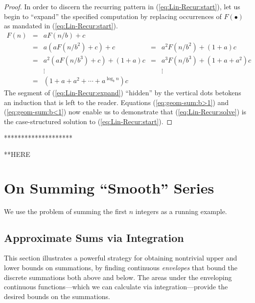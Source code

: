 {\begin{proof}
In order to discern the recurring pattern in
(\ref{eq:Lin-Recur:start}), let us begin to ``expand'' the specified
computation by replacing occurrences of $F(\bullet)$ as mandated in
(\ref{eq:Lin-Recur:start}).
\begin{equation}
\label{eq:Lin-Recur:expand}
\begin{array}{lcccc}
F(n) & = & a F(n/b) + c & & \\
     & = & a \left( a F(n/b^2) + c \right) + c
             & = & a^2 F(n/b^2) + (1 + a)c \\
     & = & a^2 \left( a F(n/b^3) + c \right) + (1+a)c
             & = & a^3 F(n/b^3) + (1 + a + a^2)c \\
     &   & \vdots & & \vdots \\
     & = & 
{\displaystyle
\left( 1 + a + a^2 + \cdots + a^{\log_b n} \right) c
} & &
\end{array}
\end{equation}
The segment of (\ref{eq:Lin-Recur:expand}) ``hidden'' by the vertical
dots betokens an induction that is left to the reader.  Equations
(\ref{eq:geom-sum:b>1}) and (\ref{eq:geom-sum:b<1}) now enable us to
demonstrate that (\ref{eq:Lin-Recur:solve}) is the case-structured
solution to (\ref{eq:Lin-Recur:start}).
\end{proof}
********************}


**HERE

\section{On Summing ``Smooth'' Series}
\label{sec:smooth-series}

We use the problem of summing the first $n$ integers as a running
example.

\subsection{Approximate Sums via Integration}
\label{sec:riemann-bounds}

This section illustrates a powerful strategy for obtaining nontrivial
upper and lower bounds on summations, by finding continuous {\em
  envelopes} that bound the discrete summations both above and below.
The areas under the enveloping continuous functions---which we can
calculate via integration---provide the desired bounds on the
summations.

